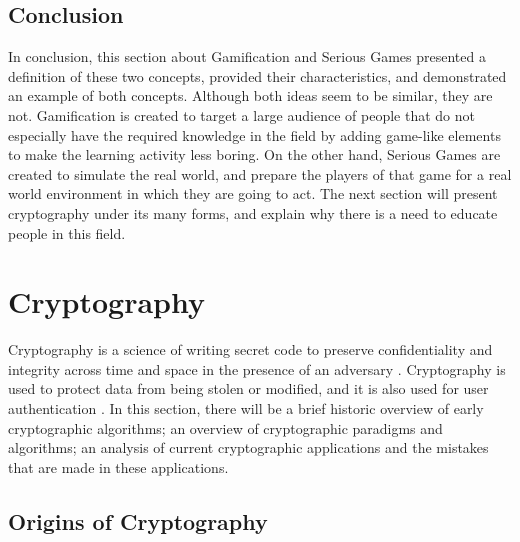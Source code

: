 \documentclass{l4proj}
\begin{document}
\subsection{Conclusion}

In conclusion, this section about Gamification and Serious Games presented a definition of these two concepts, provided their characteristics, 
and demonstrated an example of both concepts. Although both ideas seem to be similar, they are not. 
Gamification is created to target a large audience of people that do not especially have the required knowledge in the field by adding game-like elements 
to make the learning activity less boring.
On the other hand, Serious Games are created to simulate the real world, and prepare the players of that game for a real world environment in which they are going to act.
The next section will present cryptography under its many forms, and explain why there is a need to educate people in this field.

\section{Cryptography}

Cryptography is a science of writing secret code to preserve confidentiality and integrity across time and space in the presence of an adversary \citep{kessler_overview_2016} 
\citep{savage_cse_2019}. Cryptography is used to protect data from being stolen or modified, and it is also used for user authentication \citep{kessler_overview_2016}. 
In this section, there will be a brief historic overview of early cryptographic algorithms; an overview of cryptographic paradigms and algorithms; 
an analysis of current cryptographic applications and the mistakes that are made in these applications.

\subsection{Origins of Cryptography}
\end{document}

